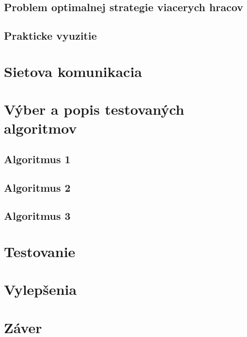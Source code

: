 \documentclass[a4paper,11pt,final]{report}
\begin{document}
\section{Problem optimalnej strategie viacerych hracov}
\section{Prakticke vyuzitie}

\chapter{Sietova komunikacia}
\chapter{Výber a popis testovaných algoritmov}
\section{Algoritmus 1}
\section{Algoritmus 2}
\section{Algoritmus 3}
\chapter{Testovanie}
\chapter{Vylepšenia}
\chapter{Záver}
\newpage
{}
\begin{thebibliography}{blablablabla}
\end{thebibliography}
\end{document}
